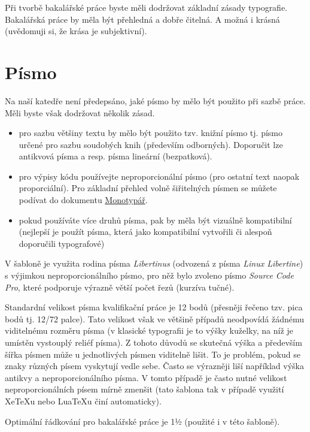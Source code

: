 \documentclass[male,czech,api_bc]{kitheses}
\begin{document}
Při tvorbě bakalářské práce byste měli dodržovat základní zásady typografie. Bakalářská práce by měla být přehledná a dobře čitelná. A možná i krásná (uvědomuji si, že krása je subjektivní).

\section{Písmo}

Na naší katedře není předepsáno, jaké písmo by mělo být použito při sazbě práce. Měli byste však dodržovat několik zásad.

\begin{itemize}
\item pro sazbu většiny textu by mělo být použito tzv. knižní písmo tj. písmo určené
pro sazbu soudobých knih (především odborných). Doporučit lze antikvová písma a resp. písma lineární (bezpatková).
\item pro výpisy kódu používejte neproporcionální písmo (pro ostatní text naopak proporciální). Pro základní přehled 
volně šiřitelných písmen se můžete podívat do dokumentu \href{https://github.com/Jiri-Fiser/thesis_ki_ujep/blob/main/monotyp%C3%A1%C5%99.pdf}{Monotypář}.
\item pokud používáte více druhů písma, pak by měla být vizuálně kompatibilní (nejlepší je použít písma, která jako kompatibilní vytvořili či alespoň doporučili typografové)
\end{itemize}

V šabloně je využita rodina písma \textit{Libertinus} (odvozená z písma \textit{Linux Libertine}) s výjimkou neproporcionálního písmo, pro něž bylo zvoleno písmo \textit{Source Code Pro}, které podporuje výrazně větší počet řezů (kurzíva tučné).

Standardní velikost písma kvalifikační práce je 12 bodů (přesněji řečeno tzv. pica bodů tj. 12/72 palce). Tato velikost však ve většině případů neodpovídá žádnému viditelnému rozměru písma (v klasické typografii je to výšky kuželky, na níž je umístěn vystouplý reliéf písma). Z  tohoto důvodů se skutečná výška a především šířka písmen může u jednotlivých písmen viditelně lišit. To je problém, pokud se znaky různých písem vyskytují vedle sebe. Často se výrazněji liší například výška antikvy a  neproporcionálního písma. V tomto případě je často nutné velikost neproporcionálních písem mírně zmenšit (tato šablona tak v případě využití XeTeXu nebo LuaTeXu činí automaticky).

Optimální řádkování pro bakalářské práce je 1½ (použité i v této šabloně).
\end{document}
